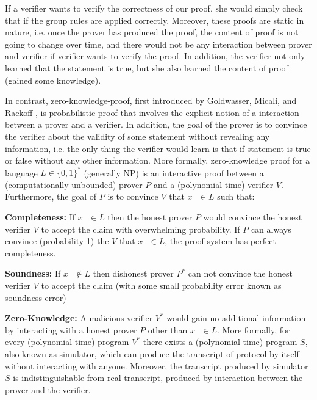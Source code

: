      If a verifier wants to verify the correctness of our proof,  she would simply check that if the group rules are applied correctly. 
     Moreover, these proofs 
     are static in nature, i.e. once the prover has produced the proof,  the content of proof is not going to change over time, and
     there would not be any interaction between prover and verifier if verifier wants to verify the proof.  In addition, the verifier 
     not only learned that the statement is true, but she also learned the content of proof (gained some knowledge).
     
     In contrast, zero-knowledge-proof, first introduced by Goldwasser, Micali, and Rackoff \citep{Goldwasser:1985:STOC} , 
     is probabilistic proof that involves the explicit notion of a interaction between 
     a prover and a verifier. In addition, 
     the goal of the prover is to convince the verifier about the validity of some statement without revealing any information, i.e. 
     the only thing the verifier would learn is that if statement is true or false without any other information. 
     More formally, zero-knowledge proof for a language $L \in \{0, 1\}^{*} $ (generally NP) is an interactive proof  
     between a (computationally unbounded) prover $P$ and a (polynomial time) verifier $V$. Furthermore, 
     the goal of $P$ is to convince $V$ that $x \text{  } \in L$  such that:
   
     \textbf{Completeness:} If $x \text{  } \in  L$ then the honest prover $P$ would convince the 
       honest verifier $V$ to accept the claim with overwhelming probability. 
       If $P$ can always convince (probability 1) the $V$ that $x \text{  }\in L$, the proof system has perfect completeness. 
    
     \textbf{Soundness:} If $x\text{  } \notin L$ then dishonest prover $P^{*}$ can not convince the honest verifier $V$ 
     to accept the claim (with some small probability error known as soundness error)
     
     \textbf{Zero-Knowledge:} A malicious verifier $V^{*}$ would gain no additional information by interacting with a honest prover $P$ 
      other than $x \text{  } \in L$. More formally, for every (polynomial time) program $V^{*}$ there exists a (polynomial time)
      program $S$, also known as simulator, which can produce the transcript of protocol by itself without interacting with anyone. 
      Moreover, the transcript 
      produced by simulator $S$ is indistinguishable from real transcript, produced by interaction between the prover and the verifier. 
      
